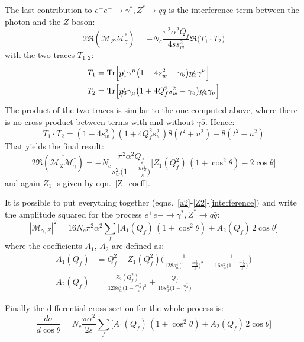 \documentclass[]{article}
\begin{document}
The last contribution to $e^+ e^- \rightarrow \gamma^*,Z^* \rightarrow q \bar{q}$
is the interference term between the photon and the $Z$ boson:
\begin{equation}
2\Re(\overline{\mathcal{M}_Z \mathcal{M}_\gamma^*} ) =
-N_c\frac{\pi^2\alpha^2 Q_f}{4s s_w^2}\Re\Big(T_1 \cdot T_2 \Big)
\end{equation}
with the two traces $T_{1,2}$:
\begin{align*}
T_1 &= \mathrm{Tr}\Big[\slashed{p_1}\gamma^\mu \big(1-4s^2_w-\gamma_5\big)\slashed{p_2}\gamma^\nu\Big]\\
T_2 & =\mathrm{Tr}\Big[\slashed{p_3}\gamma_\mu \big(1+4Q_f^2 s_w^2-\gamma_5\big)\slashed{p_4}\gamma_\nu\Big]
\end{align*}
The product of the two traces is similar to the one computed above, where there
is no cross product between terms with and without $\gamma5$. Hence:
\begin{equation}
T_1 \cdot T_2 = (1-4s_w^2)(1+4Q^2_f s_w^2)8(t^2+u^2) - 8(t^2-u^2)
\end{equation}
That yields the final result:
\begin{equation}
\label{interference}
2\Re(\overline{\mathcal{M}_Z \mathcal{M}_\gamma^*} ) =
-N_c\frac{\pi^2\alpha^2 Q_f}{ s_w^2\Big(1-\frac{m_Z^2}{s}\Big)}
\Big[Z_1(Q_f^2)\,(1+\cos^2\theta)-2\cos\theta\Big]
\end{equation}
and again $Z_1$ is given by eqn.~\ref{Z_coeff}.

It is possible to put everything together (eqns.~\ref{a2}-\ref{Z2}-\ref{interference})
and write the amplitude squared for the process
$e^+e- \rightarrow \gamma^*,Z^* \rightarrow q \bar{q}$:
\begin{equation}
|\overline{\mathcal{M}_{\gamma,Z}}|^2 =
16 N_c\pi^2\alpha^2 \sum_f\Big[A_1(Q_f)\,(1+\cos^2\theta)+ A_2(Q_f)\,2\cos\theta\Big]
\end{equation}
where the coefficients $A_1$, $A_2$ are defined as:
\begin{align*}
A_1(Q_f) &= Q_f^2 + Z_1(Q_f^2)\Bigg(\frac{1}{128s_w^4 \Big(1-\frac{m_Z^2}{s}\Big)^2} - \frac{1}{16s_w^2 \Big(1-\frac{m_Z^2}{s}\Big)}\Bigg) \\
A_2(Q_f) &= \frac{Z_2(Q_f^2)}{128s_w^4 \Big(1-\frac{m_Z^2}{s}\Big)^2}+ \frac{Q_f}{16s_w^2\Big(1-\frac{m_Z^2}{s}\Big)}
\end{align*}

Finally the differential cross section for the whole process is:
\begin{equation}
\frac{d\sigma}{d\cos\theta} =
N_c\frac{\pi\alpha^2}{2s} \sum_f\Big[A_1(Q_f)\,(1+\cos^2\theta)+ A_2(Q_f)\,2\cos\theta\Big]
\end{equation}
\end{document}
